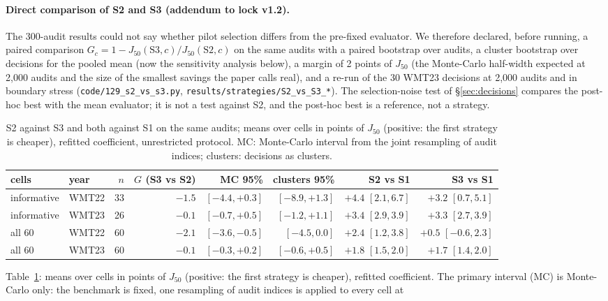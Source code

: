 \documentclass[11pt]{article}
\newcommand{\Jt}{J_{50}}
\begin{document}
\paragraph{Direct comparison of S2 and S3 (addendum to lock v1.2).} The 300-audit results could not say whether
pilot selection differs from the pre-fixed evaluator. We therefore declared, before running, a paired comparison
$G_c=1-\Jt(\mathrm{S3},c)/\Jt(\mathrm{S2},c)$ on the same audits with a paired bootstrap over audits, a cluster
bootstrap over decisions for the pooled mean (now the sensitivity analysis below), a margin of 2 points of $\Jt$ (the
Monte-Carlo half-width expected at 2,000 audits and the size of the smallest savings the paper calls real), and a
re-run of the 30 WMT23 decisions at 2,000 audits and in boundary stress (\texttt{code/129\_s2\_vs\_s3.py},
\texttt{results/strategies/S2\_vs\_S3\_*}). The selection-noise test of \S\ref{sec:decisions} compares the post-hoc best with the mean
evaluator; it is not a test against S2, and the post-hoc best is a reference, not a strategy.
\begin{table}[t]\centering\footnotesize
\begin{tabular}{llrrrrrr}\toprule
cells & year & $n$ & $G$ (S3 vs S2) & MC 95\% & clusters 95\% & S2 vs S1 & S3 vs S1\\\midrule
informative & WMT22 & 33 & $-1.5$ & $[-4.4, +0.3]$ & $[-8.9, +1.3]$ & $+4.4$ $[2.1, 6.7]$ & $+3.2$ $[0.7, 5.1]$\\
informative & WMT23 & 26 & $-0.1$ & $[-0.7, +0.5]$ & $[-1.2, +1.1]$ & $+3.4$ $[2.9, 3.9]$ & $+3.3$ $[2.7, 3.9]$\\
all 60 & WMT22 & 60 & $-2.1$ & $[-3.6, -0.5]$ & $[-4.5, 0.0]$ & $+2.4$ $[1.2, 3.8]$ & $+0.5$ $[-0.6, 2.3]$\\
all 60 & WMT23 & 60 & $-0.1$ & $[-0.3, +0.2]$ & $[-0.6, +0.5]$ & $+1.8$ $[1.5, 2.0]$ & $+1.7$ $[1.4, 2.0]$\\\bottomrule
\end{tabular}
\caption{S2 against S3 and both against S1 on the same audits; means over cells in points of $\Jt$ (positive: the
first strategy is cheaper), refitted coefficient, unrestricted protocol. MC: Monte-Carlo interval from the joint
resampling of audit indices; clusters: decisions as clusters.}\label{tab:s2s3}
\end{table}
Table~\ref{tab:s2s3}: means over cells in points of $\Jt$ (positive: the first strategy is cheaper), refitted coefficient. The primary
interval (MC) is Monte-Carlo only: the benchmark is fixed, one resampling of audit indices is applied to every cell at
\end{document}
